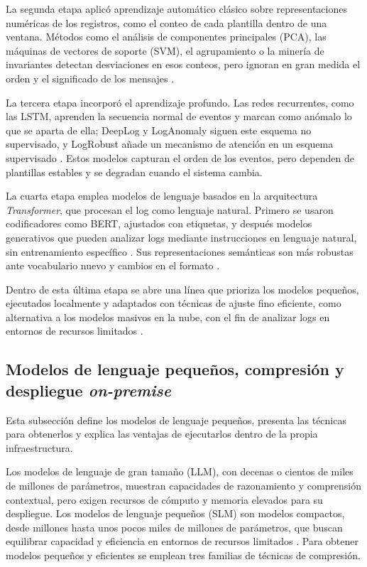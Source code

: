 La segunda etapa aplicó aprendizaje automático clásico sobre representaciones numéricas de los registros, como el conteo de cada plantilla dentro de una ventana. Métodos como el análisis de componentes principales (PCA), las máquinas de vectores de soporte (SVM), el agrupamiento o la minería de invariantes detectan desviaciones en esos conteos, pero ignoran en gran medida el orden y el significado de los mensajes \cite{he2021_survey}.

La tercera etapa incorporó el aprendizaje profundo. Las redes recurrentes, como las LSTM, aprenden la secuencia normal de eventos y marcan como anómalo lo que se aparta de ella; DeepLog y LogAnomaly siguen este esquema no supervisado, y LogRobust añade un mecanismo de atención en un esquema supervisado \cite{jiang2021_aiops}. Estos modelos capturan el orden de los eventos, pero dependen de plantillas estables y se degradan cuando el sistema cambia.

La cuarta etapa emplea modelos de lenguaje basados en la arquitectura \textit{Transformer}, que procesan el log como lenguaje natural. Primero se usaron codificadores como BERT, ajustados con etiquetas, y después modelos generativos que pueden analizar logs mediante instrucciones en lenguaje natural, sin entrenamiento específico \cite{liu2024_logprompt}. Sus representaciones semánticas son más robustas ante vocabulario nuevo y cambios en el formato \cite{murphy2024_embeddings}.

Dentro de esta última etapa se abre una línea que prioriza los modelos pequeños, ejecutados localmente y adaptados con técnicas de ajuste fino eficiente, como alternativa a los modelos masivos en la nube, con el fin de analizar logs en entornos de recursos limitados \cite{saha2025_slm_minimal}.

\subsection{Modelos de lenguaje pequeños, compresión y despliegue \textit{on-premise}}\label{sec:mt_slm}

Esta subsección define los modelos de lenguaje pequeños, presenta las técnicas para obtenerlos y explica las ventajas de ejecutarlos dentro de la propia infraestructura.

Los modelos de lenguaje de gran tamaño (LLM), con decenas o cientos de miles de millones de parámetros, muestran capacidades de razonamiento y comprensión contextual, pero exigen recursos de cómputo y memoria elevados para su despliegue. Los modelos de lenguaje pequeños (SLM) son modelos compactos, desde millones hasta unos pocos miles de millones de parámetros, que buscan equilibrar capacidad y eficiencia en entornos de recursos limitados \cite{wang2025_slm_survey}. Para obtener modelos pequeños y eficientes se emplean tres familias de técnicas de compresión.

